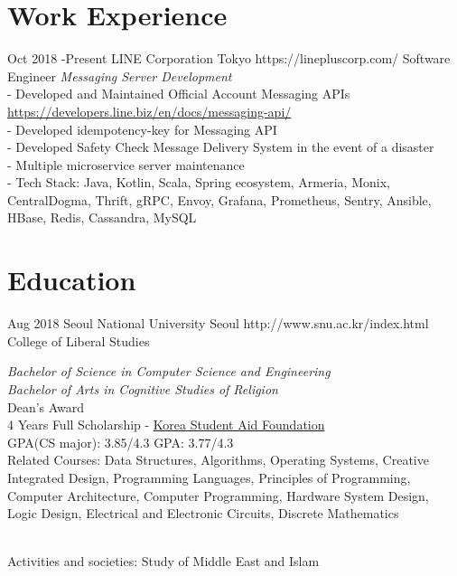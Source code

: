 \documentclass[10pt]{article} %
\begin{document}

\section{Work Experience}

\job
{Oct 2018 -}{Present}
{LINE Corporation}
{Tokyo}
{https://linepluscorp.com/}
{Software Engineer}
{
\textit{Messaging Server Development}\\
- Developed and Maintained Official Account Messaging APIs \href{https://developers.line.biz/en/docs/messaging-api/}{https://developers.line.biz/en/docs/messaging-api/}\\
- Developed idempotency-key for Messaging API\\
- Developed Safety Check Message Delivery System in the event of a disaster\\
- Multiple microservice server maintenance\\
- Tech Stack: Java, Kotlin, Scala, Spring ecosystem, Armeria, Monix, CentralDogma, Thrift, gRPC, Envoy, Grafana, Prometheus, Sentry, Ansible, HBase, Redis, Cassandra, MySQL
}



\section{Education}

\job
{Aug 2018}{}
{Seoul National University}
{Seoul}
{http://www.snu.ac.kr/index.html}
{College of Liberal Studies}
{
\textit{Bachelor of Science in Computer Science and Engineering}\\
\if{}
\textit{Bachelor of Arts in Cognitive Studies of Religion}\\
\fi
Dean's Award\\
4 Years Full Scholarship - \href{http://eng.kosaf.go.kr/jsp/main.jsp}{Korea Student Aid Foundation}\\
\if{}
GPA(CS major): 3.85/4.3\hspace{10mm} GPA: 3.77/4.3\\
Related Courses: Data Structures, Algorithms, Operating Systems, Creative Integrated Design, Programming Languages, Principles of Programming, Computer Architecture, Computer Programming, Hardware System Design, Logic Design, Electrical and Electronic Circuits, Discrete Mathematics

\\
Activities and societies: Study of Middle East and Islam
\fi
}
\end{document}
